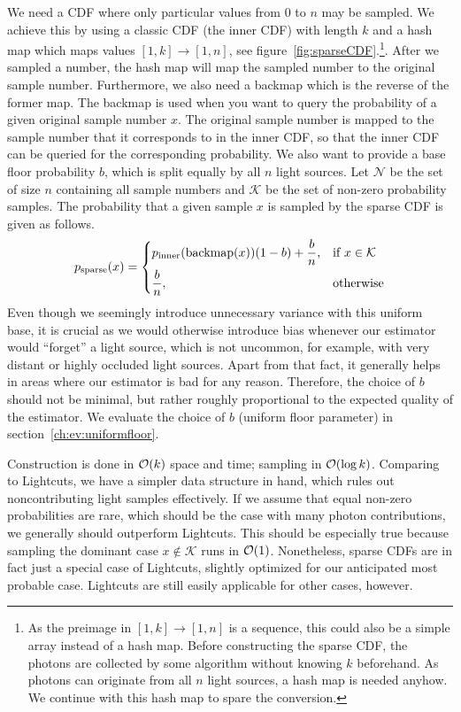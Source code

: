 We need a CDF where only particular values from $0$ to $n$ may be sampled. We achieve this by using a classic CDF (the inner CDF) with length $k$ and a hash map which maps values $[1,k]\to [1,n]$, see figure~\ref{fig:sparseCDF}.\footnote{As the preimage in $[1,k]\to [1,n]$ is a sequence, this could also be a simple array instead of a hash map. Before constructing the sparse CDF, the photons are collected by some algorithm without knowing $k$ beforehand. As photons can originate from all $n$ light sources, a hash map is needed anyhow. We continue with this hash map to spare the conversion.}. After we sampled a number, the hash map will map the sampled number to the original sample number. Furthermore, we also need a backmap which is the reverse of the former map. The backmap is used when you want to query the probability of a given original sample number $x$. The original sample number is mapped to the sample number that it corresponds to in the inner CDF, so that the inner CDF can be queried for the corresponding probability. We also want to provide a base floor probability $b$, which is split equally by all $n$ light sources. Let $\mathcal{N}$ be the set of size $n$ containing all sample numbers and $\mathcal{K}$ be the set of non-zero probability samples. The probability that a given sample $x$ is sampled by the sparse CDF is given as follows.
\begin{align}\label{eq:psparse}
 p_{\text{sparse}}(x) = 
\begin{dcases}
    p_{\text{inner}}(\text{backmap}(x))(1 - b) + \frac{b}{n},& \text{if } x \in \mathcal{K}\\
    \frac{b}{n}, & \text{otherwise}
\end{dcases}
\end{align}
Even though we seemingly introduce unnecessary variance with this uniform base, it is crucial as we would otherwise introduce bias whenever our estimator would \enquote{forget} a light source, which is not uncommon, for example, with very distant or highly occluded light sources. Apart from that fact, it generally helps in areas where our estimator is bad for any reason. Therefore, the choice of $b$ should not be minimal, but rather roughly proportional to the expected quality of the estimator. We evaluate the choice of $b$ (uniform floor parameter) in section~\ref{ch:ev:uniformfloor}.

Construction is done in $\mathcal{O}(k)$ space and time; sampling in $\mathcal{O}(\log{k})$. Comparing to Lightcuts, we have a simpler data structure in hand, which rules out noncontributing light samples effectively. If we assume that equal non-zero probabilities are rare, which should be the case with many photon contributions, we generally should outperform Lightcuts. This should be especially true because sampling the dominant case $x \notin \mathcal{K}$ runs in $\mathcal{O}(1)$. Nonetheless, sparse CDFs are in fact just a special case of Lightcuts, slightly optimized for our anticipated most probable case. Lightcuts are still easily applicable for other cases, however. 

